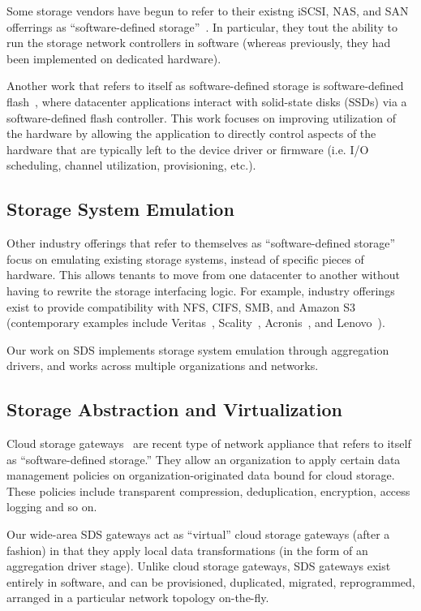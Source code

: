 Some storage vendors have begun to refer to their existng iSCSI, NAS, and SAN offerrings as
``software-defined storage''~\cite{computerweekly-storagebuzz}.  In particular,
they tout the ability to run the storage network controllers in
software (whereas previously, they had been implemented on dedicated hardware).

Another work that refers to itself as software-defined storage
is software-defined flash~\cite{sdf-baidu}, where
datacenter applications interact with solid-state disks (SSDs) via a
software-defined flash controller.  This work focuses on improving utilization
of the hardware by allowing the application to directly control aspects of the
hardware that are typically left to the device driver or firmware (i.e. I/O scheduling,
channel utilization, provisioning, etc.).

\subsection{Storage System Emulation}

Other industry offerings that refer to themselves as ``software-defined storage''
focus on emulating existing storage systems, instead of specific pieces of
hardware.  This allows tenants to move from one datacenter to another without having to
rewrite the storage interfacing logic.  For example, industry offerings exist to
provide compatibility with NFS, CIFS, SMB, and Amazon S3 (contemporary examples include
Veritas~\cite{veritas}, Scality~\cite{scality}, Acronis~\cite{acronis}, and
Lenovo~\cite{lenovo}).

Our work on SDS implements storage system emulation
through aggregation drivers, and works across multiple organizations and
networks.

\subsection{Storage Abstraction and Virtualization}

Cloud storage gateways~\cite{gartner-cloud-storage-gateway} are recent type of
network appliance that refers to itself as ``software-defined storage.''
They allow an organization to apply certain data management
policies on organization-originated data bound for cloud storage.  These
policies include transparent compression, deduplication, encryption, access
logging and so on.

Our wide-area SDS gateways act as ``virtual'' cloud storage gateways
(after a fashion) in that they apply local data transformations (in the form of
an aggregation driver stage).  Unlike cloud storage gateways, SDS gateways exist
entirely in software, and can be provisioned, duplicated, migrated,
reprogrammed, arranged in a particular network topology on-the-fly.

